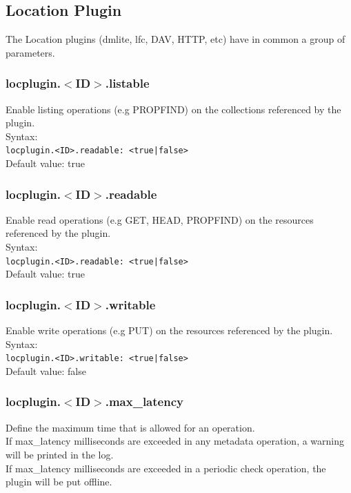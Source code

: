 \documentclass[12pt]{article} %
\begin{document}
\subsection{Location Plugin}
The Location plugins (dmlite, lfc, DAV, HTTP, etc) have in common a group of parameters.

\subsubsection{locplugin.$<$ID$>$.listable}
Enable listing operations (e.g PROPFIND) on the collections referenced by the plugin.\\
Syntax:\\
\lstinline"locplugin.<ID>.readable: <true|false>"\\
Default value: true\\

\subsubsection{locplugin.$<$ID$>$.readable}
Enable read operations (e.g GET, HEAD, PROPFIND) on the resources referenced by the plugin.\\
Syntax:\\
\lstinline"locplugin.<ID>.readable: <true|false>"\\
Default value: true\\

\subsubsection{locplugin.$<$ID$>$.writable}
Enable write operations (e.g PUT) on the resources referenced by the plugin.\\
Syntax:\\
\lstinline"locplugin.<ID>.writable: <true|false>"\\
Default value: false\\

\subsubsection{locplugin.$<$ID$>$.max\_latency}
Define the maximum time that is allowed for an operation.\\
If max\_latency milliseconds are exceeded in any metadata operation, a warning will be printed in the log.\\
If max\_latency milliseconds are exceeded in a periodic check operation, the plugin will be put offline.\\
\end{document}
